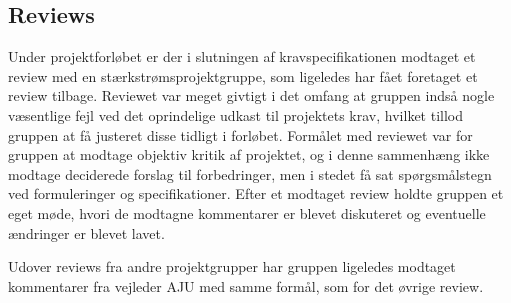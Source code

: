 \subsection{Reviews}
Under projektforløbet er der i slutningen af kravspecifikationen modtaget et review\cite{lib:Review1} med en stærkstrømsprojektgruppe, som ligeledes har fået foretaget et review tilbage.
Reviewet var meget givtigt i det omfang at gruppen indså nogle væsentlige fejl ved det oprindelige udkast til projektets krav, hvilket tillod gruppen at få justeret disse tidligt i forløbet.
Formålet med reviewet var for gruppen at modtage objektiv kritik af projektet, og i denne sammenhæng ikke modtage deciderede forslag til forbedringer, men i stedet få sat spørgsmålstegn ved formuleringer og specifikationer.
Efter et modtaget review holdte gruppen et eget møde, hvori de modtagne kommentarer er blevet diskuteret og eventuelle ændringer er blevet lavet.

Udover reviews fra andre projektgrupper har gruppen ligeledes modtaget kommentarer fra vejleder AJU med samme formål, som for det øvrige review.

\clearpage